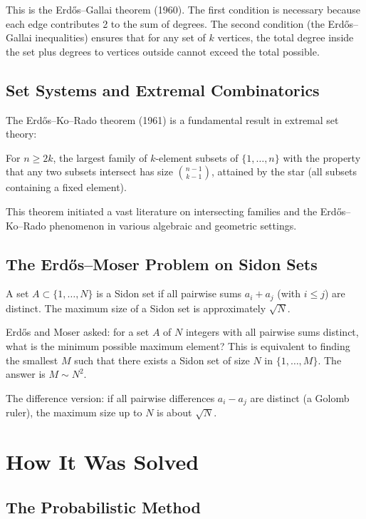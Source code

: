 This is the Erd\H{o}s--Gallai theorem (1960). The first condition is necessary because each edge contributes 2 to the sum of degrees. The second condition (the Erd\H{o}s--Gallai inequalities) ensures that for any set of $k$ vertices, the total degree inside the set plus degrees to vertices outside cannot exceed the total possible.

\subsection{Set Systems and Extremal Combinatorics}

The Erd\H{o}s--Ko--Rado theorem (1961) is a fundamental result in extremal set theory:
\begin{theorem}
For $n \geq 2k$, the largest family of $k$-element subsets of $\{1, \ldots, n\}$ with the property that any two subsets intersect has size $\binom{n-1}{k-1}$, attained by the star (all subsets containing a fixed element).
\end{theorem}

This theorem initiated a vast literature on intersecting families and the Erd\H{o}s--Ko--Rado phenomenon in various algebraic and geometric settings.

\subsection{The Erd\H{o}s--Moser Problem on Sidon Sets}

A set $A \subset \{1, \ldots, N\}$ is a Sidon set if all pairwise sums $a_i + a_j$ (with $i \leq j$) are distinct. The maximum size of a Sidon set is approximately $\sqrt{N}$.

Erd\H{o}s and Moser asked: for a set $A$ of $N$ integers with all pairwise sums distinct, what is the minimum possible maximum element? This is equivalent to finding the smallest $M$ such that there exists a Sidon set of size $N$ in $\{1, \ldots, M\}$. The answer is $M \sim N^2$.

The difference version: if all pairwise differences $a_i - a_j$ are distinct (a Golomb ruler), the maximum size up to $N$ is about $\sqrt{N}$.

\section{How It Was Solved}

\subsection{The Probabilistic Method}

